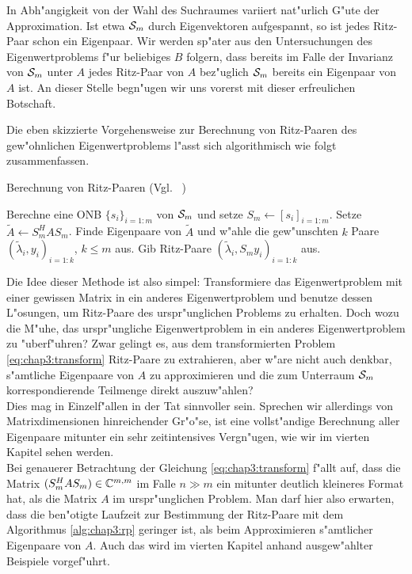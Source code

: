 In Abh"angigkeit von der Wahl
des Suchraumes variiert nat"urlich G"ute der Approximation. Ist etwa $\S_m$
durch Eigenvektoren aufgespannt, so ist jedes Ritz-Paar schon ein Eigenpaar.
Wir werden sp"ater aus den Untersuchungen des Eigenwertproblems f"ur beliebiges $B$ folgern,
dass bereits im Falle der Invarianz von $\S_m$ unter $A$ jedes Ritz-Paar von $A$ bez"uglich $\S_m$ bereits ein Eigenpaar von $A$ ist.
An dieser Stelle begn"ugen wir uns vorerst mit dieser erfreulichen Botschaft.

\newpage

Die eben skizzierte Vorgehensweise zur Berechnung von Ritz-Paaren des gew"ohnlichen Eigenwertproblems
l"asst sich algorithmisch wie folgt zusammenfassen.

\begin{algorithm}
\caption{Berechnung von Ritz-Paaren (Vgl. ~\cite[Algorithmus 4.5, 98]{saad})}\label{alg:chap3:rp}
\begin{algorithmic}[1]
\State Berechne eine ONB $\{s_i\}_{i=1:m}$ von $\S_m$ und setze $S_m\gets[s_i]_{i=1:m}$.
\State Setze $\widetilde{A}\gets S_m^H A S_m$.
\State Finde Eigenpaare von $\widetilde{A}$ und w"ahle die gew"unschten $k$ Paare $(\widetilde{\lambda}_i, y_i)_{i=1:k}$, $k\le m$ aus.
\State Gib Ritz-Paare $(\widetilde{\lambda}_i, S_m y_i)_{i=1:k}$ aus.
\end{algorithmic}
\end{algorithm}

Die Idee dieser Methode ist also simpel: Transformiere das Eigenwertproblem mit
einer gewissen Matrix in ein anderes Eigenwertproblem und benutze dessen L"osungen,
um Ritz-Paare des urspr"unglichen Problems zu erhalten.
Doch wozu die M"uhe, das urspr"ungliche Eigenwertproblem in ein anderes
Eigenwertproblem zu "uberf"uhren? Zwar gelingt es, aus dem transformierten Problem
\eqref{eq:chap3:transform} Ritz-Paare zu extrahieren, aber w"are nicht auch denkbar,
s"amtliche Eigenpaare von $A$ zu approximieren und die zum Unterraum $\S_m$
korrespondierende Teilmenge direkt auszuw"ahlen?\\

Dies mag in Einzelf"allen in der Tat sinnvoller sein. Sprechen wir allerdings
von Matrixdimensionen hinreichender Gr"o"se, ist eine vollst"andige
Berechnung aller Eigenpaare mitunter ein sehr zeitintensives Vergn"ugen, wie wir im vierten Kapitel sehen werden.\\

Bei
genauerer Betrachtung der Gleichung \eqref{eq:chap3:transform} f"allt auf, dass die
Matrix $(S_m^H A S_m) \in \C^{m,m}$ im Falle $n \gg m$ ein mitunter deutlich kleineres
Format hat, als die Matrix $A$ im urspr"unglichen Problem. Man darf hier also erwarten,
dass die ben"otigte Laufzeit zur Bestimmung der Ritz-Paare mit dem Algorithmus \ref{alg:chap3:rp}
geringer ist, als beim Approximieren s"amtlicher Eigenpaare von $A$. Auch das
wird im vierten Kapitel anhand ausgew"ahlter Beispiele vorgef"uhrt.\\

